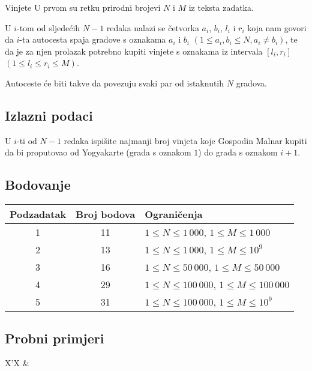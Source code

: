 \begin{statement}[
  problempoints=100,
  timelimit=1 sekunda,
  memorylimit=512 MiB,
]{Vinjete}
U prvom su retku prirodni brojevi $N$ i $M$ iz teksta zadatka.

U $i$-tom od sljedećih $N-1$ redaka nalazi se četvorka $a_i$, $b_i$, $l_i$ i
$r_i$ koja nam govori da $i$-ta autocesta spaja gradove s oznakama $a_i$ i
$b_i$ $(1 \le a_i, b_i \le N, a_i \ne b_i)$, te da je za njen prolazak
potrebno kupiti vinjete s oznakama iz intervala $[l_i, r_i]$ $(1 \le l_i \le
r_i \le M)$.

Autoceste će biti takve da povezuju svaki par od istaknutih $N$ gradova.

\subsection*{Izlazni podaci}

U $i$-ti od $N - 1$ redaka ispišite najmanji broj vinjeta koje Gospodin Malnar
kupiti da bi proputovao od Yogyakarte (grada s oznakom $1$) do grada s
oznakom $i+1$.

\subsection*{Bodovanje}

{\renewcommand{\arraystretch}{1.4}
  \setlength{\tabcolsep}{6pt}
  \begin{tabular}{ccl}
   Podzadatak & Broj bodova & Ograničenja \\ \midrule
    1 & 11 & $1 \le N \le 1\,000$, $1 \le M \le 1\,000$ \\
    2 & 13 & $1 \le N \le 1\,000$, $1 \le M \le 10^9$ \\
    3 & 16 & $1 \le N \le 50\,000$, $1 \le M \le 50\,000$\\
    4 & 29 & $1 \le N \le 100\,000$, $1 \le M \le 100\,000$\\
    5 & 31 & $1 \le N \le 100\,000$, $1 \le M \le 10^9$
\end{tabular}}

\subsection*{Probni primjeri}
\begin{tabularx}{\textwidth}{X'X}
 &
\end{tabularx}


\end{statement}
